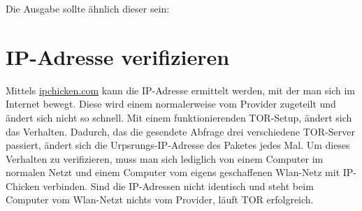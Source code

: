 Die Ausgabe sollte ähnlich dieser sein:


\section{IP-Adresse verifizieren}
Mittels \url{ipchicken.com} kann die IP-Adresse ermittelt werden, mit der man sich im Internet bewegt. Diese wird einem normalerweise vom Provider zugeteilt und ändert sich nicht so schnell. Mit einem funktionierenden TOR-Setup, ändert sich das Verhalten. Dadurch, das die gesendete Abfrage drei verschiedene TOR-Server passiert, ändert sich die Urpsrungs-IP-Adresse des Paketes jedes Mal. Um dieses Verhalten zu verifizieren, muss man sich lediglich von einem Computer im normalen Netzt und einem Computer vom eigens geschaffenen Wlan-Netz mit IP-Chicken verbinden. Sind die IP-Adressen nicht identisch und steht beim Computer vom Wlan-Netzt nichts vom Provider, läuft TOR erfolgreich.
